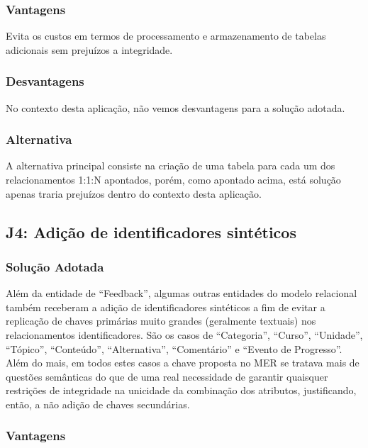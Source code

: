 \subsubsection{Vantagens}

Evita os custos em termos de processamento e armazenamento de tabelas
adicionais sem prejuízos a integridade.

\subsubsection{Desvantagens}

No contexto desta aplicação, não vemos desvantagens para a solução adotada.

\subsubsection{Alternativa}

A alternativa principal consiste na criação de uma tabela para cada um dos
relacionamentos 1:1:N apontados, porém, como apontado acima, está solução
apenas traria prejuízos dentro do contexto desta aplicação.

\subsection{\textbf{J4:} Adição de identificadores sintéticos}

\subsubsection{Solução Adotada}

Além da entidade de ``Feedback'', algumas outras entidades do modelo relacional
também receberam a adição de identificadores sintéticos a fim de evitar a
replicação de chaves primárias muito grandes (geralmente textuais) nos
relacionamentos identificadores. São os casos de ``Categoria'', ``Curso'',
``Unidade'', ``Tópico'', ``Conteúdo'', ``Alternativa'', ``Comentário'' e
``Evento de Progresso''. Além do mais, em todos estes casos a chave proposta no
MER se tratava mais de questões semânticas do que de uma real necessidade de
garantir quaisquer restrições de integridade na unicidade da combinação dos
atributos, justificando, então, a não adição de chaves secundárias.

\subsubsection{Vantagens}

